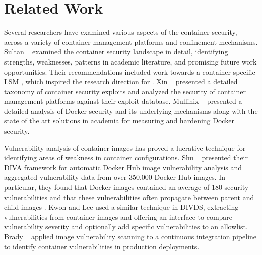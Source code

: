\section{Related Work}
\label{sec:related}

Several researchers \cite{sultan2019_container_security,xin2018_container_security,mullinix2020_security_measures} have examined various aspects of the container security, across a variety of container management platforms and confinement mechanisms. Sultan \etal~\cite{sultan2019_container_security} examined the container security landscape in detail, identifying strengths, weaknesses, patterns in academic literature,  and promising future work opportunities. Their recommendations included work towards a container-specific LSM \cite{sultan2019_container_security}, which inspired the research direction for \bpfcontain{}. Xin \etal~\cite{xin2018_container_security} presented a detailed taxonomy of container security exploits and analyzed the security of container management platforms against their exploit database. Mullinix \etal~\cite{mullinix2020_security_measures} presented a detailed analysis of Docker security and its underlying mechanisms along with the state of the art solutions in academia for measuring and hardening Docker security.

Vulnerability analysis of container images \cite{shu2017_image_vuln,kwon2020_divds,brady2020_docker_cloud} has proved a lucrative technique for identifying areas of weakness in container configurations. Shu \etal~\cite{shu2017_image_vuln} presented their DIVA framework for automatic Docker Hub image vulnerability analysis and aggregated vulnerability data from over 350,000 Docker Hub images. In particular, they found that Docker images contained an average of 180 security vulnerabilities and that these vulnerabilities often propagate between parent and child images \cite{shu2017_image_vuln}. Kwon and Lee \cite{kwon2020_divds} used a similar technique in DIVDS, extracting vulnerabilities from container images and offering an interface to compare vulnerability severity and optionally add specific vulnerabilities to an allowlist. Brady \etal~\cite{brady2020_docker_cloud} applied image vulnerability scanning to a continuous integration pipeline to identify container vulnerabilities in production deployments.

